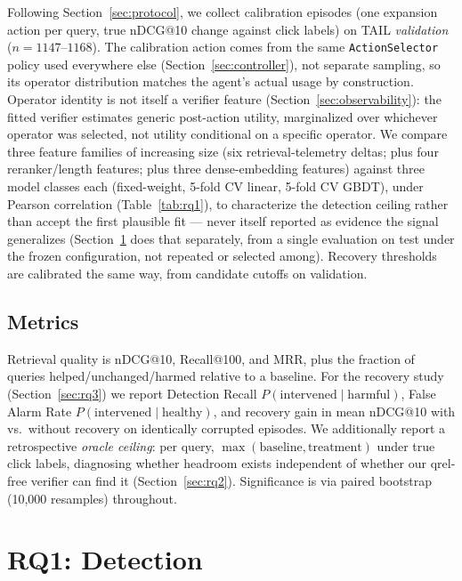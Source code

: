 \documentclass[conference]{IEEEtran}
\begin{document}
Following Section~\ref{sec:protocol}, we collect calibration episodes
(one expansion action per query, true nDCG@10 change against click
labels) on TAIL \emph{validation} ($n=1147$--$1168$). The calibration
action comes from the same \texttt{ActionSelector} policy used
everywhere else (Section~\ref{sec:controller}), not separate sampling,
so its operator distribution matches the agent's actual usage by
construction. Operator identity is not itself a verifier feature
(Section~\ref{sec:observability}): the fitted verifier estimates
generic post-action utility, marginalized over whichever operator was
selected, not utility conditional on a specific operator. We compare
three feature families of increasing size (six retrieval-telemetry
deltas; plus four reranker/length features; plus three dense-embedding
features) against three model classes each (fixed-weight, 5-fold CV
linear, 5-fold CV GBDT), under Pearson correlation (Table~\ref{tab:rq1}),
to characterize the detection ceiling rather than accept the first
plausible fit --- never itself reported as evidence the signal
generalizes (Section~\ref{sec:rq1} does that separately, from a single
evaluation on test under the frozen configuration, not repeated or
selected among). Recovery thresholds are calibrated the same
way, from candidate cutoffs on validation.

\subsection{Metrics}

Retrieval quality is nDCG@10, Recall@100, and MRR, plus the fraction of
queries helped/unchanged/harmed relative to a baseline. For the
recovery study (Section~\ref{sec:rq3}) we report Detection Recall
$P(\text{intervened}\mid\text{harmful})$, False Alarm Rate
$P(\text{intervened}\mid\text{healthy})$, and recovery gain in mean
nDCG@10 with vs.\ without recovery on identically corrupted episodes.
We additionally report a retrospective \emph{oracle ceiling}: per
query, $\max(\text{baseline}, \text{treatment})$ under true click
labels, diagnosing whether headroom exists independent of whether our
qrel-free verifier can find it (Section~\ref{sec:rq2}). Significance is
via paired bootstrap (10{,}000 resamples) throughout.

\section{RQ1: Detection}
\label{sec:rq1}
\end{document}
